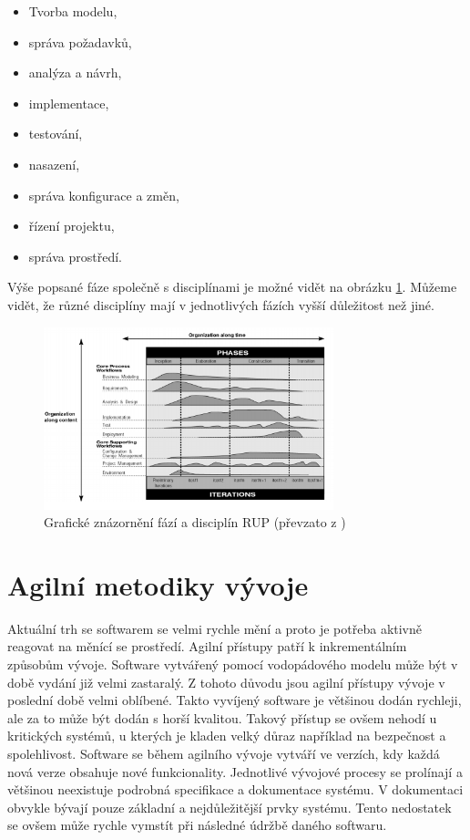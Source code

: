 \documentclass[czech,master]{diploma}
\begin{document}
\begin{itemize}
\item Tvorba modelu,
\item správa požadavků,
\item analýza a návrh,
\item implementace,
\item testování,
\item nasazení,
\item správa konfigurace a změn,
\item řízení projektu,
\item správa prostředí.
\end{itemize}

Výše popsané fáze společně s disciplínami je možné vidět na obrázku \ref{fig:rup}. Můžeme vidět, že různé disciplíny mají v jednotlivých fázích vyšší důležitost než jiné.

\begin{figure}[!ht]
    \centering
    \includegraphics[width=0.75\textwidth]{Diplomka/Figures/rup.png}
    \caption{Grafické znázornění fází a disciplín RUP (převzato z \cite{ref:rup_ibm})}
    \label{fig:rup}
\end{figure}

\section{Agilní metodiky vývoje}
Aktuální trh se softwarem se velmi rychle mění a proto je potřeba aktivně reagovat na měnící se prostředí. Agilní přístupy patří k inkrementálním způsobům vývoje. Software vytvářený pomocí vodopádového modelu může být v době vydání již velmi zastaralý. Z tohoto důvodu jsou agilní přístupy vývoje v poslední době velmi oblíbené. Takto vyvíjený software je většinou dodán rychleji, ale za to může být dodán s horší kvalitou. Takový přístup se ovšem nehodí u kritických systémů, u kterých je kladen velký důraz například na bezpečnost a spolehlivost. Software se během agilního vývoje vytváří ve verzích, kdy každá nová verze obsahuje nové funkcionality. Jednotlivé vývojové procesy se prolínají a většinou neexistuje podrobná specifikace a dokumentace systému. V dokumentaci obvykle bývají pouze základní a nejdůležitější prvky systému. Tento nedostatek se ovšem může rychle vymstít při následné údržbě daného softwaru.
\end{document}
